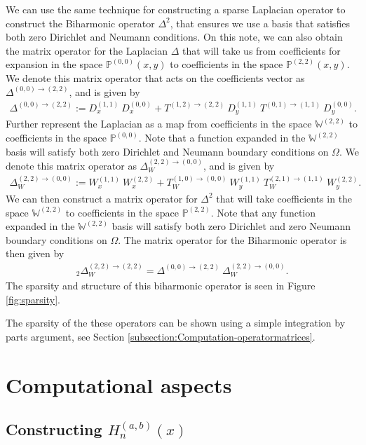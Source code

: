 \documentclass[11pt, oneside]{article}   	%
\newcommand{\bigP}{\mathbb{P}}
\newcommand{\bigPoo}{{\mathbb{P}^{(0,0)}}}
\newcommand{\laplacewtt}{\Delta_W^{(2,2)\to(0,0)}}
\newcommand{\laplaceoo}{\Delta^{(0,0)\to(2,2)}}
\newcommand{\biharmonic}{_2\Delta_W^{(2,2)\to(2,2)}}
\newcommand{\bigW}{\mathbb{W}}
\begin{document}
We can use the same technique for constructing a sparse Laplacian operator to construct the Biharmonic operator $\Delta^2$, that ensures we use a basis that satisfies both zero Dirichlet and Neumann conditions. On this note, we can also obtain the matrix operator for the Laplacian $\Delta$ that will take us from coefficients for expansion in the space $\bigPoo(x,y)$ to coefficients in the space $\bigP^{(2,2)}(x,y)$. We denote this matrix operator that acts on the coefficients vector as $\laplaceoo$, and is given by
\begin{align}
    \laplaceoo := D_x^{(1,1)} \: D_x^{(0,0)} + T^{(1,2)\to(2,2)} \: D_y^{(1,1)} \: T^{(0,1)\to(1,1)} \: D_y^{(0,0)}.
\end{align}
Further represent the Laplacian as a map from coefficients in the space $\bigW^{(2,2)}$ to coefficients in the space $\bigPoo$. Note that a function expanded in the $\bigW^{(2,2)}$ basis will satisfy both zero Dirichlet and Neumann boundary conditions on $\Omega$. We denote this matrix operator as $\laplacewtt$, and is given by
\begin{align}
	\laplacewtt := W_x^{(1,1)} \: W_x^{(2,2)} + T_W^{(1,0)\to(0,0)} \: W_y^{(1,1)} \: T_W^{(2,1)\to(1,1)} \: W_y^{(2,2)}.
\end{align}
We can then construct a matrix operator for $\Delta^2$ that will take coefficients in the space $\bigW^{(2,2)}$ to coefficients in the space $\bigP^{(2,2)}$. Note that any function expanded in the $\bigW^{(2,2)}$ basis will satisfy both zero Dirichlet and zero Neumann boundary conditions on $\Omega$. The matrix operator for the Biharmonic operator is then given by
\begin{align}
	\biharmonic = \laplaceoo \: \laplacewtt.
\end{align}
The sparsity and structure of this biharmonic operator is seen in Figure \ref{fig:sparsity}.

The sparsity of the these operators can be shown using a simple integration by parts argument, see Section \ref{subsection:Computation-operatormatrices}.



\section{Computational aspects}\label{Section:Computation}

\subsection{Constructing $H_n^{(a,b)}(x)$}
\end{document}

